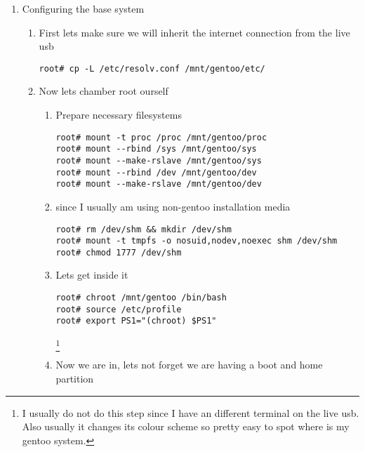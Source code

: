 \documentclass[10pt,a4paper]{article}
\begin{document}
\begin{enumerate}
\begin{enumerate}[label*=\arabic*.]
\begin{enumerate}[label*=\arabic*.]
			\end{enumerate}

		\end{enumerate}
	
		\newpage
		
		\item Configuring the base system \begin{enumerate}[label*=\arabic*.]
			
			\item First lets make sure we will inherit the internet connection from the live usb
			\begin{lstlisting}[style=BashInputRoot]
root# cp -L /etc/resolv.conf /mnt/gentoo/etc/
			\end{lstlisting}
			
			\item Now lets chamber root ourself \begin{enumerate}[label*=\arabic*.]
				\item Prepare necessary filesystems
				
				\begin{lstlisting}[style=BashInputRoot]
root# mount -t proc /proc /mnt/gentoo/proc 
root# mount --rbind /sys /mnt/gentoo/sys
root# mount --make-rslave /mnt/gentoo/sys 
root# mount --rbind /dev /mnt/gentoo/dev
root# mount --make-rslave /mnt/gentoo/dev 
				\end{lstlisting}
			
				\item since I usually am using non-gentoo installation media
				\begin{lstlisting}[style=BashInputRoot]
root# rm /dev/shm && mkdir /dev/shm 
root# mount -t tmpfs -o nosuid,nodev,noexec shm /dev/shm
root# chmod 1777 /dev/shm
				\end{lstlisting}
				
				\item Lets get inside it
				\begin{lstlisting}[style=BashInputRoot]
root# chroot /mnt/gentoo /bin/bash 
root# source /etc/profile 
root# export PS1="(chroot) $PS1"
				\end{lstlisting}\footnote{I usually do not do this step since I have an different terminal on the live usb. Also usually it changes its colour scheme so pretty easy to spot where is my gentoo system.}
			
			\item Now we are in, lets not forget we are having a boot and home partition \begin{enumerate}[label*=\arabic*.]


\end{enumerate}
\end{enumerate}
\end{enumerate}
\end{enumerate}
\end{document}
